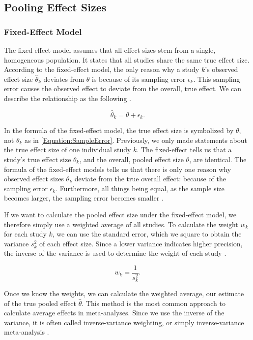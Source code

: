 \documentclass[../../../main.tex]{subfiles}
\begin{document}
\subsection{Pooling Effect Sizes}

\subsubsection{Fixed-Effect Model}

The fixed-effect model assumes that all effect sizes stem from a single, homogeneous population. It states that all studies share the same true effect size. According to the fixed-effect model, the only reason why a study $k$'s observed effect size $\hat{\theta}_k$ deviates from $\theta$ is because of its sampling error $\epsilon_k$. This sampling error causes the observed effect to deviate from the overall, true effect. We can describe the relationship as the following \autocite{Harrer2021}.

\begin{equation}
\hat{\theta}_k = \theta + \epsilon_k.
\end{equation}

In the formula of the fixed-effect model, the true effect size is symbolized by $\theta$, not $\theta_k$ as in \autoref{Equation:SampleError}. Previously, we only made statements about the true effect size of one individual study $k$. The fixed-effect tells us that a study's true effect size $\theta_k$, and the overall, pooled effect size $\theta$, are identical. The formula of the fixed-effect models tells us that there is only one reason why observed effect sizes $\theta_k$ deviate from the true overall effect: because of the sampling error $\epsilon_k$. Furthermore, all things being equal, as the sample size becomes larger, the sampling error becomes smaller \autocite{Harrer2021}.

If we want to calculate the pooled effect size under the fixed-effect model, we therefore simply use a weighted average of all studies. To calculate the weight $w_k$ for each study $k$, we can use the standard error, which we square to obtain the variance $s_k^2$ of each effect size. Since a lower variance indicates higher precision, the inverse of the variance is used to determine the weight of each study \autocite{Harrer2021}.

\begin{equation}
w_k = \frac{1}{s_k^2}.
\end{equation}

Once we know the weights, we can calculate the weighted average, our estimate of the true pooled effect $\hat{\theta}$. This method is the most common approach to calculate average effects in meta-analyses. Since we use the inverse of the variance, it is often called inverse-variance weighting, or simply inverse-variance meta-analysis \autocite{Harrer2021}.
\end{document}
